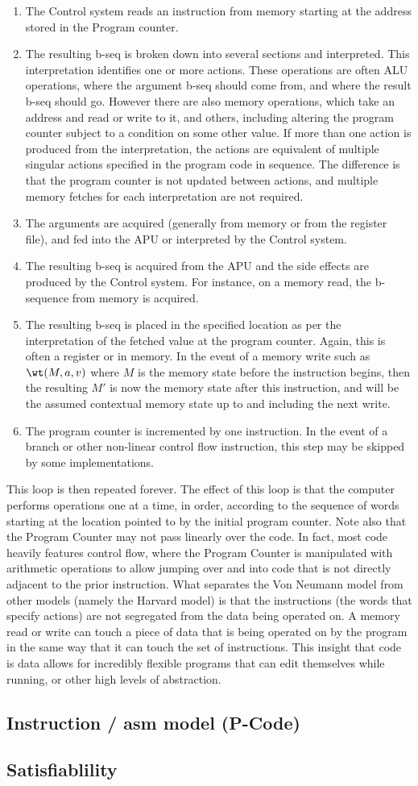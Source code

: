 \documentclass[11pt]{article}
\begin{document}
\begin{enumerate}
\item The Control system reads an instruction from memory starting at the
address stored in
the Program counter.
\item The resulting b-seq is broken down into several sections and
interpreted. This interpretation identifies one or more actions. These
operations are often ALU operations, where the argument b-seq should
come from, and where the result b-seq should go. However there are
also memory operations, which take an address and read or write to it,
and others, including altering the program counter subject to a
condition on some other value. If more than one action is produced from the
interpretation, the actions are equivalent of multiple singular actions
specified in the program code in sequence. The difference is that the
program counter is not updated between actions, and multiple memory fetches
for each interpretation are not required.
\item The arguments are acquired (generally from memory or from the
register file), and fed into the APU or interpreted by the Control
system.
\item The resulting b-seq is acquired from the APU and the side effects are
produced by the Control system. For instance, on a memory read, the
b-sequence from memory is acquired.
\item The resulting b-seq is placed in the specified location as per the
interpretation of the fetched value at the program counter. Again,
this is often a register or in memory. In the event of a memory write
such as $\wt(M,a,v)$ where $M$ is the memory state before the
instruction begins, then the resulting $M'$ is now the memory state
after this instruction, and will be the assumed contextual memory
state up to and including the next write.
\item The program counter is incremented by one instruction. In the event of
 a branch or other non-linear control flow instruction, this step may be skipped by some implementations.
\end{enumerate}

This loop is then repeated forever. The effect of this loop is that
the computer performs operations one at a time, in order, according to
the sequence of words starting at the location pointed to by the
initial program counter. Note also that the Program Counter may not
pass linearly over the code. In fact, most code heavily features
control flow, where the Program Counter is manipulated with arithmetic
operations to allow jumping over and into code that is not directly
adjacent to the prior instruction. What separates the Von Neumann
model from other models (namely the Harvard model) is that the
instructions (the words that specify actions) are not segregated from
the data being operated on. A memory read or write can touch a piece
of data that is being operated on by the program in the same way that
it can touch the set of instructions. This insight that code is data
allows for incredibly flexible programs that can edit themselves while
running, or other high levels of abstraction.

\subsection{Instruction / asm model (P-Code)}
\label{sec:orgaa30e34}
\subsection{Satisfiablility}
\label{sec:orgfd6ea0a}
\end{document}
